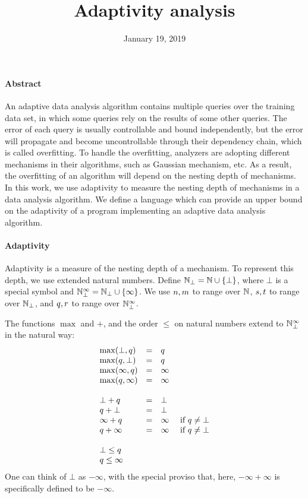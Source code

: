 \documentclass[a4paper,11pt]{article}
\title{Adaptivity analysis}
\author{}
\date{January 19, 2019}
\theoremstyle{definition}
\begin{document}
\maketitle

\paragraph{Abstract}
An adaptive data analysis algorithm contains multiple queries over the training data set, in which some queries rely on the results of some other queries. The error of each query is usually controllable and bound independently, but the error will propagate and become uncontrollable through their dependency chain, which is called overfitting. To handle  the overfitting, analyzers are adopting different mechanisms in their algorithms, such as Gaussian mechanism, etc. As a result, the overfitting of an algorithm will depend on the nesting depth of mechanisms. In this work, we use adaptivity to measure the nesting depth of mechanisms in a data analysis algorithm. We define a language which can provide an upper bound on the adaptivity of a program implementing an adaptive data analysis algorithm.

\paragraph{Adaptivity}
Adaptivity is a measure of the nesting depth of a mechanism. To
represent this depth, we use extended natural numbers. Define $\mathbb{N}_{\bot} =
\mathbb{N} \cup \{\bot\}$, where $\bot$ is a special symbol and $\mathbb{N}_{\bot}^\infty =
\mathbb{N}_{\bot} \cup \{\infty\}$. We use $n, m$ to range over $\mathbb{N}$,
$s, t$ to range over $\mathbb{N}_{\bot}$, and $q, r$ to
range over $\mathbb{N}_{\bot}^\infty$.

The functions $\max$ and $+$, and the order $\leq$ on natural numbers
extend to $\mathbb{N}_{\bot}^\infty$ in the natural way:
\[\begin{array}{lcl}
\max(\bot, \nnatbiA) & = & \nnatbiA \\
\max(\nnatbiA, \bot) & = & \nnatbiA \\
\max(\infty, \nnatbiA) & = & \infty \\
\max(\nnatbiA, \infty) & = & \infty \\
\\
%
\bot + \nnatbiA & = & \bot \\
\nnatbiA + \bot & = & \bot \\
\infty + \nnatbiA & = & \infty ~~~~ \mbox{if } \nnatbiA \neq \bot \\
\nnatbiA + \infty & = & \infty ~~~~ \mbox{if } \nnatbiA \neq \bot \\
\\
%
\bot \leq \nnatbiA \\
\nnatbiA \leq \infty
\end{array}
\]
One can think of $\bot$ as $-\infty$, with the special proviso that,
here, $-\infty + \infty$ is specifically defined to be $-\infty$.
\end{document}
